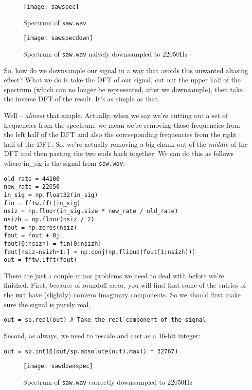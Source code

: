 \begin{figure}[ht]\caption{Spectrum of \texttt{saw.wav}}\label{sawspec}\centering\texttt{[image: sawspec]}\end{figure}

\begin{figure}[ht]\caption{Spectrum of \texttt{saw.wav} naively downsampled to 22050Hz}\label{sawspecdown}\centering\texttt{[image: sawspecdown]}\end{figure}

So, how do we downsample our signal in a way that avoids this unwanted aliasing effect? What we do is take the DFT of our signal, cut out the upper half of the spectrum (which can no longer be represented, after we downsample), then take the inverse DFT of the result. It's as simple as that.

Well -- \emph{almost} that simple. Actually, when we say we're cutting out a set of frequencies from the spectrum, we mean we're removing those frequencies from the left half of the DFT and also the corresponding frequencies from the right half of the DFT. So, we're actually removing a big chunk out of the \emph{middle} of the DFT and then pasting the two ends back together. We can do this as follows where in\_sig is the signal from \texttt{saw.wav}:
\begin{lstlisting}
old_rate = 44100
new_rate = 22050
in_sig = np.float32(in_sig)
fin = fftw.fft(in_sig)
nsiz = np.floor(in_sig.size * new_rate / old_rate)
nsizh = np.floor(nsiz / 2)
fout = np.zeros(nsiz)
fout = fout + 0j
fout[0:nsizh] = fin[0:nsizh]
fout[nsiz-nsizh+1:] = np.conj(np.flipud(fout[1:nsizh]))
out = fftw.ifft(fout)
\end{lstlisting}
There are just a couple minor problems we need to deal with before we're finished.
First, because of roundoff error, you will find that some of the entries of the \texttt{out} have (slightly) nonzero imaginary components.
So we should first make sure the signal is purely real,
\begin{lstlisting}
out = sp.real(out) # Take the real component of the signal
\end{lstlisting}
Second, as always, we need to rescale and cast as a 16-bit integer:
\begin{lstlisting}
out = sp.int16(out/sp.absolute(out).max() * 32767)
\end{lstlisting}


\begin{figure}[ht]\caption{Spectrum of \texttt{saw.wav} correctly downsampled to 22050Hz}\label{sawspecdown2}\centering\texttt{[image: sawdownspec]}\end{figure}

